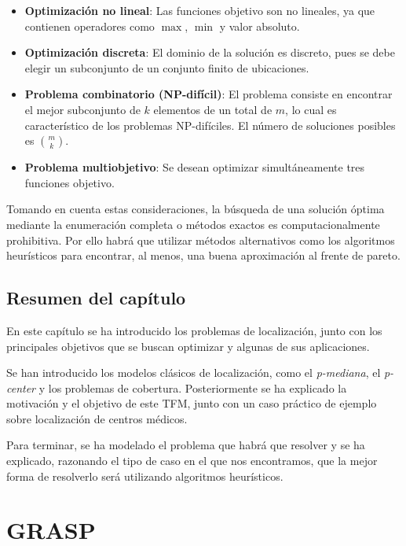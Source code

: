 \documentclass[12pt,a4paper]{book}
\begin{document}
\begin{itemize}
    \item \textbf{Optimización no lineal}: Las funciones objetivo son no lineales, ya que contienen operadores como $\max$, $\min$ y valor absoluto.
    
    \item \textbf{Optimización discreta}: El dominio de la solución es discreto, pues se debe elegir un subconjunto de un conjunto finito de ubicaciones.
    
    \item \textbf{Problema combinatorio (NP-difícil)}: El problema consiste en encontrar el mejor subconjunto de $k$ elementos de un total de $m$, lo cual es característico de los problemas NP-difíciles. El número de soluciones posibles es $\binom{m}{k}$.
    
    \item \textbf{Problema multiobjetivo}: Se desean optimizar simultáneamente tres funciones objetivo.
\end{itemize}

Tomando en cuenta estas consideraciones,  la búsqueda de una solución óptima mediante la enumeración completa o métodos exactos es computacionalmente prohibitiva. Por ello habrá que utilizar
métodos alternativos como los algoritmos heurísticos para encontrar, al menos, una buena aproximación al frente de pareto.

\section{Resumen del capítulo}

En este capítulo se ha introducido los problemas de localización, junto con los principales objetivos que se buscan optimizar y algunas de sus aplicaciones.

Se han introducido los modelos clásicos de localización, como el \textit{p-mediana}, el \textit{p-center} y los problemas de cobertura. Posteriormente se ha explicado la motivación y el objetivo de este TFM, junto con un 
caso práctico de ejemplo sobre localización de centros médicos.

Para terminar, se ha modelado el problema que habrá que resolver y se ha explicado, razonando el tipo de caso en el que nos encontramos,
que la mejor forma de resolverlo será utilizando algoritmos heurísticos.


\chapter{GRASP}
\end{document}
